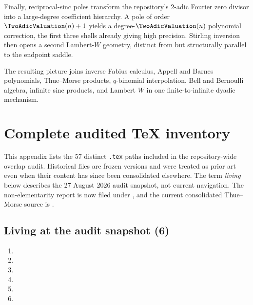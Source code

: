 \documentclass[11pt,oneside]{article}
\numberwithin{equation}{section}
\theoremstyle{definition}
\theoremstyle{remark}
\begin{document}
Finally, reciprocal-sinc poles transform the repository's $2$-adic Fourier zero divisor into a
large-degree coefficient hierarchy.  A pole of order $\TwoAdicValuation(n)+1$ yields a degree-$\TwoAdicValuation(n)$
polynomial correction, the first three shells already giving high precision.  Stirling inversion then
opens a second Lambert-$W$ geometry, distinct from but structurally parallel to the endpoint saddle.

The resulting picture joins inverse Fabius calculus, Appell and Barnes polynomials, Thue--Morse
products, $q$-binomial interpolation, Bell and Bernoulli algebra, infinite sinc products, and Lambert
$W$ in one finite-to-infinite dyadic mechanism.

\appendix

\section{Complete audited TeX inventory}
\label{p2:app:inventory}

This appendix lists the 57 distinct \texttt{.tex} paths included in the
repository-wide overlap audit. Historical files are frozen versions and were
treated as prior art even when their content has since been consolidated
elsewhere.  The term \emph{living} below describes the 27 August 2026 audit
snapshot, not current navigation.  The non-elementarity report is now filed
under
,
and the current consolidated Thue--Morse source is
.

\subsection{Living at the audit snapshot (6)}
\begin{enumerate}
\item {}
\item {}
\item {}
\item {}
\item {}
\item {}
\end{enumerate}
\end{document}
